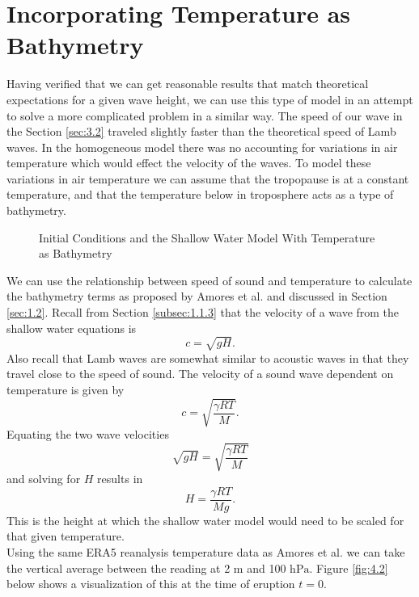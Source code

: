 \documentclass[twoside]{bsu-ms}
\begin{document}
\chapter{Incorporating Temperature as Bathymetry}\label{ch:4}
Having verified that we can get reasonable results that match theoretical expectations for a given wave height, we can use this type of model in an attempt to solve a more complicated problem in a similar way. The speed of our wave in the Section \ref{sec:3.2} traveled slightly faster than the theoretical speed of Lamb waves. In the homogeneous model there was no accounting for variations in air temperature which would effect the velocity of the waves. To model these variations in air temperature we can assume that the tropopause is at a constant temperature, and that the temperature below in troposphere acts as a type of bathymetry.
\begin{figure}[!htbp]
	\centering
	
	\caption{Initial Conditions and the Shallow Water Model With Temperature as Bathymetry}
	\label{fig:4.1}
\end{figure}
 We can use the relationship between speed of sound and temperature to calculate the bathymetry terms as proposed by Amores et al. \cite{amores2022numerical} and discussed in Section \ref{sec:1.2}. Recall from Section \ref{subsec:1.1.3} that the velocity of a wave from the shallow water equations is 
 \begin{equation}\label{eq:4.1}
    c =\sqrt{gH}.
 \end{equation}
 Also recall that Lamb waves are somewhat similar to acoustic waves in that they travel close to the speed of sound. The velocity of a sound wave dependent on temperature is given by
 \begin{equation}\label{eq:4.2}
     c=\sqrt{\frac{\gamma R T}{M}}.
 \end{equation}
 Equating the two wave velocities
\begin{equation}\label{eq:4.3}
	\sqrt{gH}=\sqrt{\frac{\gamma R T}{M}}
\end{equation}
and solving for $H$ results in 
\begin{equation}\label{eq:4.4}
	H=\frac{\gamma R T}{Mg}.
\end{equation}
This is the height at which the shallow water model would need to be scaled for that given temperature.\\
\indent Using the same ERA5 reanalysis temperature data as Amores et al. \cite{amores2022numerical} we can take the vertical average between the reading at 2 $\mathrm{m}$ and 100 $\mathrm{hPa}$. Figure \ref{fig:4.2} below shows a visualization of this at the time of eruption $t=0$.
\end{document}
